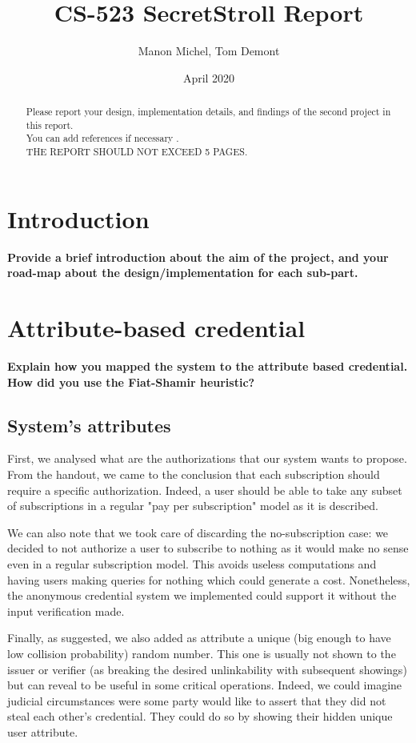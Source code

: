 \documentclass[10pt,conference,compsocconf]{IEEEtran}
\title{CS-523 SecretStroll Report}
\author{Manon Michel, Tom Demont}
\date{April 2020}
\begin{document}
\maketitle

\begin{abstract}
    Please report your design, implementation details, and findings of the second project in this report. \\
    You can add references if necessary \cite{article}. \\
    THE REPORT SHOULD NOT EXCEED 5 PAGES.
\end{abstract}

\section{Introduction}

\textbf{Provide a brief introduction about the aim of the project, and your road-map about the design/implementation for each sub-part.}

\section{Attribute-based credential}
\textbf{Explain how you mapped the system to the attribute based credential. How did you
use the Fiat-Shamir heuristic?}
\subsection{System's attributes}
First, we analysed what are the authorizations that our system wants to propose. From the handout, we came to the conclusion that each subscription should require a specific authorization. Indeed, a user should be able to take any subset of subscriptions in a regular "pay per subscription" model as it is described.

We can also note that we took care of discarding the no-subscription case: we decided to not authorize a user to subscribe to nothing as it would make no sense even in a regular subscription model. This avoids useless computations and having users making queries for nothing which could generate a cost. Nonetheless, the anonymous credential system we implemented could support it without the input verification made.

Finally, as suggested, we also added as attribute a unique (big enough to have low collision probability) random number. This one is usually not shown to the issuer or verifier (as breaking the desired unlinkability with subsequent showings) but can reveal to be useful in some critical operations. Indeed, we could imagine judicial circumstances were some party would like to assert that they did not steal each other's credential. They could do so by showing their hidden unique user attribute.
\end{document}
